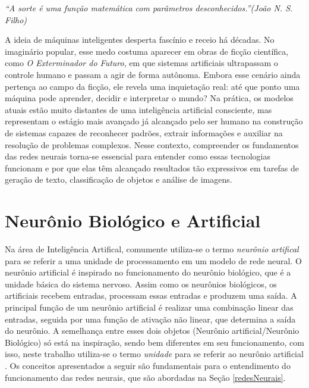 
\vspace{1cm}

\begin{flushright}
\textit{``A sorte é uma função matemática com parâmetros desconhecidos.''(João N. S. Filho)}
\end{flushright}
\vspace{1cm}

A ideia de máquinas inteligentes desperta fascínio e receio há décadas. No imaginário popular, esse medo costuma aparecer em obras de ficção científica, como \textit{O Exterminador do Futuro}, em que sistemas artificiais ultrapassam o controle humano e passam a agir de forma autônoma. Embora esse cenário ainda pertença ao campo da ficção, ele revela uma inquietação real: até que ponto uma máquina pode aprender, decidir e interpretar o mundo? Na prática, os modelos atuais estão muito distantes de uma inteligência artificial consciente, mas representam o estágio mais avançado já alcançado pelo ser humano na construção de sistemas capazes de reconhecer padrões, extrair informações e auxiliar na resolução de problemas complexos. Nesse contexto, compreender os fundamentos das redes neurais torna-se essencial para entender como essas tecnologias funcionam e por que elas têm alcançado resultados tão expressivos em tarefas de geração de texto, classificação de objetos e análise de imagens.
\section{Neurônio Biológico e Artificial}

\label{sec_1}
Na área de Inteligência Artifical, comumente utiliza-se o termo \textit{neurônio artifical} para se referir a uma unidade de processamento em um modelo de rede neural. O neurônio artificial é inspirado no funcionamento do neurônio biológico, que é a unidade básica do sistema nervoso. Assim como os neurônios biológicos, os artificiais recebem entradas, processam essas entradas e produzem uma saída. A principal função de um neurônio artificial é realizar uma combinação linear das entradas, seguida por uma função de ativação não linear, que determina a saída do neurônio. A semelhança entre esses dois objetos (Neurônio artificial/Neurônio Biológico) só está na inspiração, sendo bem diferentes em seu funcionamento, com isso, neste trabalho utiliza-se o termo \textit{unidade}  para se referir ao neurônio artificial \cite{cnn}. Os conceitos apresentados a seguir são fundamentais para o entendimento do funcionamento das redes neurais, que são abordadas na Seção \ref{redesNeurais}.

